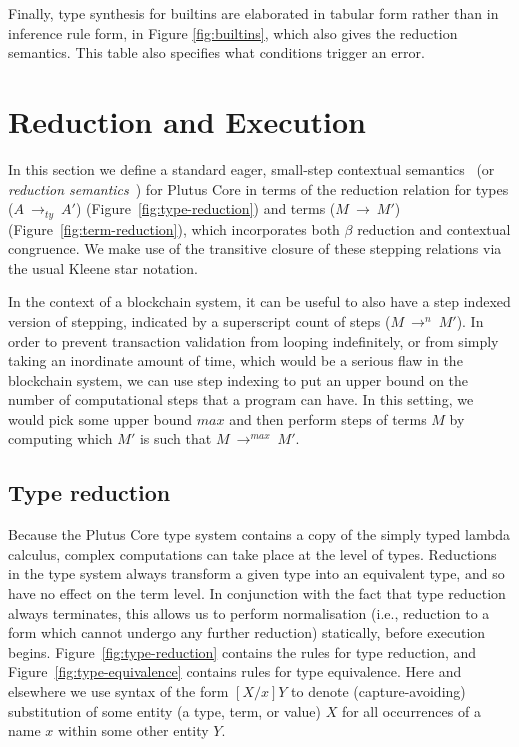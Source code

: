 \documentclass[a4paper]{article}
\newcommand{\typeStep}[2]{#1 ~ \rightarrow_{ty} ~ #2}
\newcommand{\step}[2]{#1 ~ \rightarrow ~ #2}
\newcommand{\multistepIndexed}[3]{#1 ~ \rightarrow^{#2} ~ #3}
\begin{document}
\noindent Finally, type synthesis for builtins are elaborated in tabular form
rather than in inference rule form, in Figure
\ref{fig:builtins}, which also gives the reduction
semantics. This table also specifies what conditions trigger an error.


\section{Reduction and Execution}
\label{sec:reduction}

In this section we define a standard eager,
small-step contextual semantics~\citep[5.3]{Harper:PFPL} (or
\textit{reduction semantics}~\citep[\S2]{Felleisen-Hieb}) for Plutus
Core in terms of the reduction relation for types
(\(\typeStep{A}{A'}\)) (Figure~\ref{fig:type-reduction})
and terms (\(\step{M}{M'}\)) (Figure~\ref{fig:term-reduction}), which
incorporates both $\beta$ reduction and contextual congruence. We make
use of the transitive closure of these stepping relations via the
usual Kleene star notation.

In the context of a blockchain system, it can be useful to also have a
step indexed version of stepping, indicated by a superscript count of
steps (\(\multistepIndexed{M}{n}{M'}\)). In order to prevent
transaction validation from looping indefinitely, or from simply
taking an inordinate amount of time, which would be a serious
flaw in the blockchain system, we can use step indexing to put an
upper bound on the number of computational steps that a program can
have. In this setting, we would pick some upper bound $\mathit{max}$
and then perform steps of terms $M$ by computing which $M'$ is such
that \(\multistepIndexed{M}{\mathit{max}}{M'}\).



\subsection{Type reduction}
Because the Plutus Core type system contains a copy of the simply
typed lambda calculus, complex computations can take place at the
level of types.  Reductions in the type system always transform a
given type into an equivalent type, and so have no effect on the term
level.  In conjunction with the fact that type reduction always
terminates, this allows us to perform normalisation (i.e., reduction
to a form which cannot undergo any further reduction) statically,
before execution begins.  Figure~\ref{fig:type-reduction} contains the
rules for type reduction, and Figure~\ref{fig:type-equivalence}
contains rules for type equivalence.  Here and elsewhere we use syntax
of the form $[X/x]Y$ to denote (capture-avoiding) substitution of
some entity (a type, term, or value) $X$ for all occurrences of a name
$x$ within some other entity $Y$.
\end{document}

